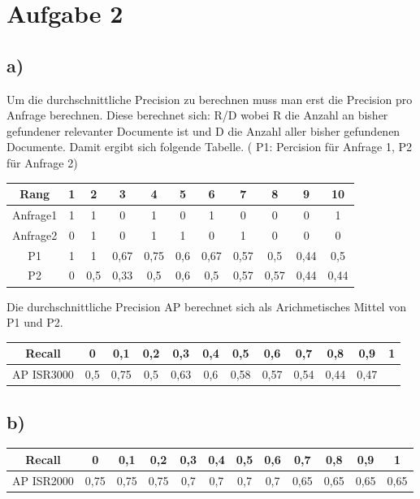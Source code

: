 \section*{Aufgabe 2}

\subsection*{a)}
Um die durchschnittliche Precision zu berechnen muss man erst die Precision pro Anfrage berechnen.
Diese berechnet sich: R/D wobei R die Anzahl an bisher gefundener relevanter Documente ist und D die Anzahl aller bisher gefundenen Documente. Damit ergibt sich folgende Tabelle. ( P1: Percision für Anfrage 1, P2 für Anfrage 2)
\begin{center}
\begin{tabular}{|c|c|c|c|c|c|c|c|c|c|c|}
\hline Rang 	& 1 & 2  & 3  & 4  & 5  & 6  & 7  & 8  & 9  & 10 \\ 
\hline Anfrage1 & 1 & 1  & 0  & 1  & 0  & 1  & 0  & 0  & 0  & 1  \\ 
\hline Anfrage2 & 0 & 1  & 0  & 1  & 1  & 0  & 1  & 0  & 0  & 0 \\ 
\hline P1	    & 1 & 1	 & 0,67 & 0,75 & 0,6& 0,67&	0,57 & 0,5& 0,44 & 0,5\\
\hline P2		& 0	& 0,5 & 0,33 & 0,5 & 0,6 & 0,5 & 0,57 & 0,57 & 0,44 & 0,44 \\
\hline 
\end{tabular} 
\end{center}
Die durchschnittliche Precision AP berechnet sich als Arichmetisches Mittel von P1 und P2.\\
\begin{center}
\begin{tabular}{|c|c|c|c|c|c|c|c|c|c|c|c|}
\hline Recall 	  & 0    & 0,1  &  0,2 & 0,3 & 0,4 & 0,5 & 0,6 & 0,7  & 0,8  & 0,9  & 1 \\
\hline AP ISR3000 & 0,5 & 0,75 & 0,5 & 0,63 & 0,6 & 0,58 & 0,57 & 0,54 & 0,44 & 0,47 & \\
\hline

\end{tabular}
\end{center}

\subsection*{b)}
\begin{center}
\begin{tabular}{|c|c|c|c|c|c|c|c|c|c|c|c|}
\hline Recall 	  & 0    & 0,1  &  0,2 & 0,3 & 0,4 & 0,5 & 0,6 & 0,7  & 0,8  & 0,9  & 1 \\
\hline AP ISR2000 & 0,75 & 0,75 & 0,75 & 0,7 & 0,7 & 0,7 &0,7 & 0,65 & 0,65 & 0,65 & 0,65\\

\hline

\end{tabular}
\end{center}

